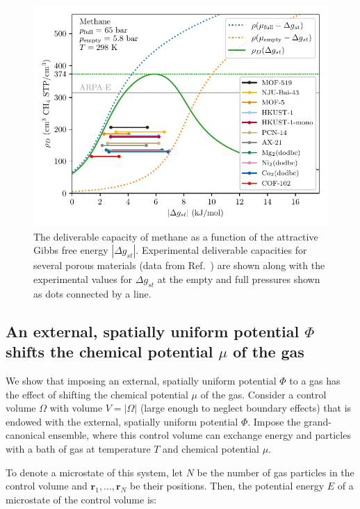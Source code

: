 \documentclass[twoside,twocolumn,9pt]{article}
\newcommand\V{\Phi}
\newcommand\gst{\ensuremath{\Delta g_{st}}}
\begin{document}
\begin{figure}
    \centering
    \includegraphics[width=0.95\columnwidth]{methane-298-n-vs-G}
    \caption{The deliverable capacity of methane as a function of the attractive Gibbs free energy $|\gst|$.
    Experimental deliverable capacities for several porous materials (data from Ref.~\cite{mason2014evaluating, furukawa2009storage, tian2018sol, gandara2014high, zhang2017fine}) are shown along with the experimental values for $\gst$ at the empty and full pressures shown as dots connected by a line.}
    \label{fig:methane-298-D}
\end{figure}

\subsection{An external, spatially uniform potential $\V$ shifts the chemical potential $\mu$ of the gas} \label{sec:V_shifts_chem_pot}
We show that imposing an external, spatially uniform potential $\V$ to a gas
has the effect of shifting the chemical potential $\mu$ of the gas. Consider a control volume $\Omega$ with volume
$V=|\Omega|$ (large enough to neglect boundary effects) that is endowed with
the external, spatially uniform potential $\V$. Impose the grand-canonical
ensemble, where this control volume can exchange energy and particles with a
bath of gas at temperature $T$ and chemical potential $\mu$.

To denote a microstate of this system, let $N$ be the number of gas particles
in the control volume and $\mathbf{r}_1,...,\mathbf{r}_N$ be their positions.
Then, the potential energy $E$ of a microstate of the control volume is:
\end{document}
